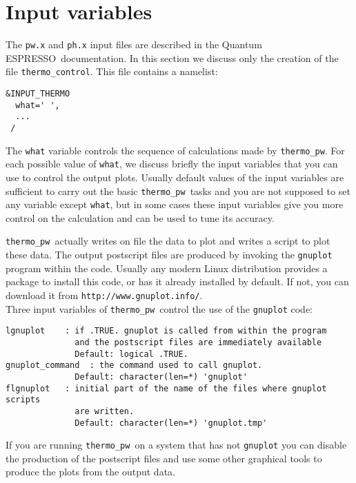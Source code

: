 \documentclass[12pt,a4paper]{article}
\def\qe{{\sc Quantum ESPRESSO}}
\def\thermo{\texttt{thermo\_pw}}
\begin{document}
\newpage

\section{\color{coral}Input variables}

The \texttt{pw.x} and \texttt{ph.x} input files are described in the \qe\ documentation.
In this section we discuss only the creation of the file
\texttt{thermo\_control}. This file contains a namelist:  
\begin{verbatim}
&INPUT_THERMO
  what=' ',
  ...
 /
\end{verbatim}
The \texttt{what} variable controls the sequence of calculations made
by \thermo. For each possible value of \texttt{what}, we discuss briefly the
input variables that you can use to control the output plots. Usually
default values of the input variables are sufficient to carry out  
the basic \thermo\ tasks and you are not supposed to set any variable except
\texttt{what}, but in some cases these input variables give you more control
on the calculation and can be used to tune its accuracy.

\thermo\ actually writes on file the data to plot and writes a script to plot
these data. The output postscript files are produced by invoking the 
\texttt{gnuplot} program within the code. Usually any modern Linux 
distribution provides a package to install this code, or has it already 
installed by default. If not, you can download it from 
\texttt{http://www.gnuplot.info/}. \\
Three input variables of \thermo\ control 
the use of the \texttt{gnuplot} code:

\begin{verbatim}
lgnuplot    : if .TRUE. gnuplot is called from within the program
              and the postscript files are immediately available
              Default: logical .TRUE.
gnuplot_command  : the command used to call gnuplot.
              Default: character(len=*) 'gnuplot'
flgnuplot   : initial part of the name of the files where gnuplot scripts 
              are written.
              Default: character(len=*) 'gnuplot.tmp'
\end{verbatim}
If you are running \thermo\ on a system that has not \texttt{gnuplot}
you can disable the production of the postscript files and use some other
graphical tools to produce the plots from the output data. 
\end{document}
